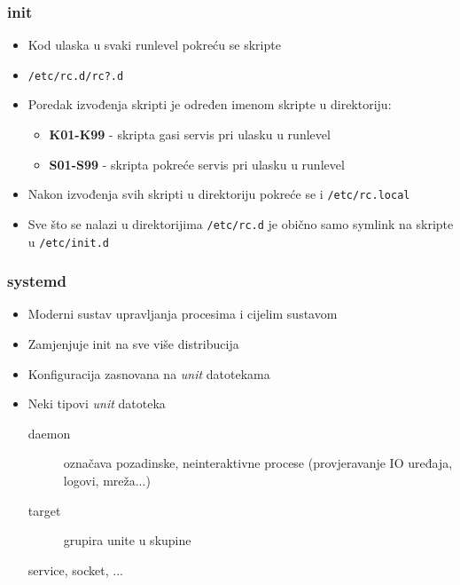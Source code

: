 \documentclass[t]{beamer}
\begin{document}
\begin{frame}
	\frametitle{init}
	\begin{itemize}
		\item Kod ulaska u svaki runlevel pokreću se skripte
		\item[] \texttt{/etc/rc.d/rc?.d}
		\item Poredak izvođenja skripti je određen imenom skripte u direktoriju:
		\begin{itemize}
			\item[] \textbf{K01-K99} - skripta gasi servis pri ulasku u runlevel
			\item[] \textbf{S01-S99} - skripta pokreće servis pri ulasku u runlevel
		\end{itemize}
		\item Nakon izvođenja svih skripti u direktoriju pokreće se i \texttt{/etc/rc.local}
		\item Sve što se nalazi u direktorijima \texttt{/etc/rc.d} je obično samo symlink na skripte u \texttt{/etc/init.d}

	\end{itemize}
\end{frame}




\begin{frame}
	\frametitle{systemd}
	\begin{itemize}
		\item Moderni sustav upravljanja procesima i cijelim sustavom
		\item Zamjenjuje init na sve više distribucija
	\end{itemize}
	\begin{itemize}
		\item Konfiguracija zasnovana na \emph{unit} datotekama
		\item Neki tipovi \emph{unit} datoteka
		\begin{description}
			\item[daemon] označava pozadinske, neinteraktivne procese (provjeravanje IO uređaja, logovi, mreža...)
			\item[target] grupira unite u skupine
			\item[service, socket, ...]
		\end{description}
	\end{itemize}
\end{frame}
\end{document}
